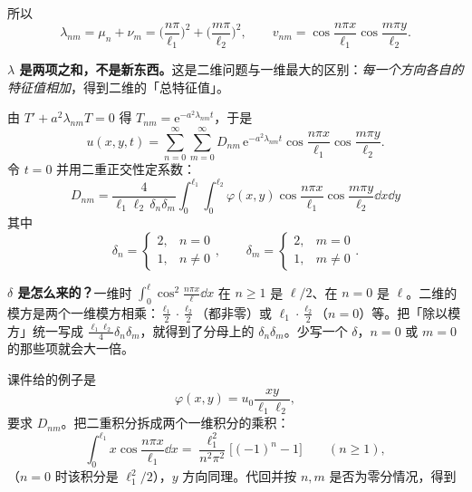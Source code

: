 \documentclass[11pt]{ctexart}
\let\origsubhdr\subhdr
\renewcommand{\subhdr}[1]{\par\needspace{3\baselineskip}\origsubhdr{#1}}
\begin{document}
所以
\begin{equation}
  \lambda_{nm}=\mu_n+\nu_m=\Big(\frac{n\pi}{\ell_1}\Big)^2+\Big(\frac{m\pi}{\ell_2}\Big)^2,
  \qquad
  v_{nm}=\cos\frac{n\pi x}{\ell_1}\cos\frac{m\pi y}{\ell_2}.
\end{equation}

\textbf{$\lambda$ 是两项之和，不是新东西。}这是二维问题与一维最大的区别：\emph{每一个方向各自的特征值相加}，得到二维的「总特征值」。


由 $T'+a^2\lambda_{nm}T=0$ 得 $T_{nm}=\mathrm e^{-a^2\lambda_{nm}t}$，于是
\begin{equation}
  u(x,y,t)=\sum_{n=0}^{\infty}\sum_{m=0}^{\infty}D_{nm}\,
  \mathrm e^{-a^2\lambda_{nm}t}\cos\frac{n\pi x}{\ell_1}\cos\frac{m\pi y}{\ell_2}.
\end{equation}
令 $t=0$ 并用二重正交性定系数：
\begin{equation}
  \boxed{\;
  D_{nm}=\frac{4}{\ell_1\ell_2\,\delta_n\delta_m}
  \int_0^{\ell_1}\!\!\int_0^{\ell_2}\varphi(x,y)
  \cos\frac{n\pi x}{\ell_1}\cos\frac{m\pi y}{\ell_2}\dd x\dd y\;}
\end{equation}
其中
\begin{equation}
  \delta_n=\begin{cases}2,& n=0\\ 1,& n\ne0\end{cases},\qquad
  \delta_m=\begin{cases}2,& m=0\\ 1,& m\ne0\end{cases}.
\end{equation}

\textbf{$\delta$ 是怎么来的？}一维时 $\int_0^{\ell}\cos^2\frac{n\pi x}{\ell}\dd x$ 在 $n\ge1$ 是 $\ell/2$、在 $n=0$ 是 $\ell$。二维的模方是两个一维模方相乘：$\frac{\ell_1}{2}\cdot\frac{\ell_2}{2}$（都非零）或 $\ell_1\cdot\frac{\ell_2}{2}$（$n=0$）等。把「除以模方」统一写成 $\frac{\ell_1\ell_2}{4}\delta_n\delta_m$，就得到了分母上的 $\delta_n\delta_m$。少写一个 $\delta$，$n=0$ 或 $m=0$ 的那些项就会大一倍。

\label{sec:dnm}

课件给的例子是
\begin{equation}
  \varphi(x,y)=u_0\frac{xy}{\ell_1\ell_2},
\end{equation}
要求 $D_{nm}$。把二重积分拆成两个一维积分的乘积：
\begin{equation}
  \int_0^{\ell_1}x\cos\frac{n\pi x}{\ell_1}\dd x=\frac{\ell_1^2}{n^2\pi^2}\big[(-1)^n-1\big]\qquad(n\ge1),
\end{equation}
（$n=0$ 时该积分是 $\ell_1^2/2$），$y$ 方向同理。代回并按 $n,m$ 是否为零分情况，得到
\end{document}

